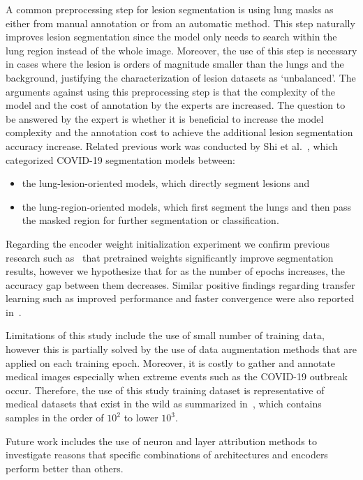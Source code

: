 \documentclass{elsarticle}
\begin{document}
A common preprocessing step for lesion segmentation is using lung
masks as either from manual annotation or from an automatic method.
This step naturally improves lesion segmentation since the model only
needs to search within the lung region instead of the whole image.
Moreover, the use of this step is necessary in cases where the lesion
is orders of magnitude smaller than the lungs and the background,
justifying the characterization of lesion datasets as `unbalanced'.
The arguments against using this preprocessing step is that the
complexity of the model and the cost of annotation by the experts are increased.
The question to be answered by the expert is whether it is beneficial
to increase the model complexity and the annotation cost to achieve
the additional lesion segmentation accuracy increase.
Related previous work was conducted by Shi et
al.~\cite{shi2020review}, which categorized COVID-19 segmentation
models between:
\begin{itemize}
  \item the lung-lesion-oriented models, which directly segment lesions and
  \item the lung-region-oriented models, which first segment the
    lungs and then pass the masked region for further segmentation or
    classification.
\end{itemize}

Regarding the encoder weight initialization experiment we confirm
previous research such as~\cite{orsic2019defense} that pretrained
weights significantly improve segmentation results, however we
hypothesize that for as the number of epochs increases, the accuracy
gap between them decreases.
Similar positive findings regarding transfer learning such as
improved performance and faster convergence were also reported
in~\cite{wang2020does}.

Limitations of this study include the use of small number of training
data, however this is partially solved by the use of data
augmentation methods that are applied on each training epoch.
Moreover, it is costly to gather and annotate medical images
especially when extreme events such as the COVID-19 outbreak occur.
Therefore, the use of this study training dataset is representative
of medical datasets that exist in the wild as summarized
in~\cite{hesamian2019deep}, which contains samples in the order of
$10^2$ to lower $10^3$.

Future work includes the use of neuron and layer attribution methods
to investigate reasons that specific combinations of architectures
and encoders perform better than others.
\end{document}
